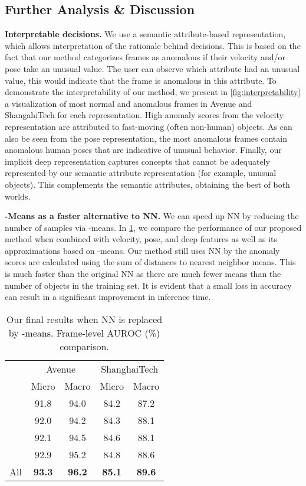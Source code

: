 \documentclass[10pt,twocolumn,letterpaper]{article}
\begin{document}
\subsection{Further Analysis \& Discussion}

\textbf{Interpretable decisions.} We use a semantic attribute-based representation, which allows interpretation of the rationale behind decisions. This is based on the fact that our method categorizes frames as anomalous if their velocity and/or pose take an unusual value. The user can observe which attribute had an unusual value, this would indicate that the frame is anomalous in this attribute. To demonstrate the interpretability of our method, we present in \cref{fig:interpretability} a visualization of most normal and anomalous frames in Avenue and ShangahiTech for each representation. High anomaly scores from the velocity representation are attributed to fast-moving (often non-human) objects. As can also be seen from the pose representation, the most anomalous frames contain anomalous human poses that are indicative of unusual behavior. Finally, our implicit deep representation captures concepts that cannot be adequately represented by our semantic attribute representation (for example, unusual objects). This complements the semantic attributes, obtaining the best of both worlds.

\textbf{-Means as a faster alternative to NN.} We can speed up NN by reducing the number of samples via -means. In \cref{tab:k-means}, we compare the performance of our proposed method when combined with velocity, pose, and deep features as well as its approximations based on -means. Our method still uses NN by the anomaly scores are calculated using the sum of distances to nearest neighbor means. This is much faster than the original NN as there are much fewer means than the number of objects in the training set. It is evident that a small loss in accuracy can result in a significant improvement in inference time.

\begin{table}[t]
	\newcommand{\tabincell}[2]{\begin{tabular}{@{}#1@{}}#2\end{tabular}}
	\centering
\begin{tabular}{| l | c | c | c | c |}
		\hline
	    \multirow{2}{*}{} & \multicolumn{2}{c|}{Avenue} & \multicolumn{2}{c|}{ShanghaiTech} \\ 
		\cline{2-5}
		 & Micro & Macro & Micro & Macro \\
		\hline
		  &  91.8 & 94.0 & 84.2 & 87.2 \\
		   & 92.0 & 94.2 & 84.3 & 88.1 \\
		  & 92.1 & 94.5 & 84.6 & 88.1 \\
		  & 92.9 & 95.2 & 84.8 & 88.6 \\
		All  & \textbf{93.3} & \textbf{96.2} & \textbf{85.1} & \textbf{89.6} \\
		\hline
\end{tabular}
	\caption{Our final results when NN is replaced by -means. Frame-level AUROC (\%) comparison.}
	\label{tab:k-means}
\end{table} 
\end{document}
